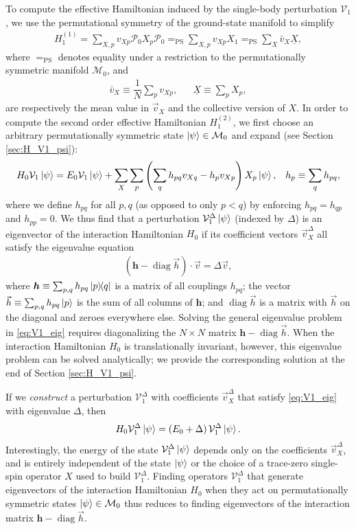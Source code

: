 \documentclass[nofootinbib,notitlepage,11pt]{revtex4-2}
\newcommand{\f}[2]{\dfrac{#1}{#2}} %
\newcommand{\p}[1]{\left(#1\right)} %
\renewcommand{\c}{\cdot} %
\newcommand{\m}{\bm} %
\renewcommand{\v}{\vec} %
\newcommand{\1}{\mathds{1}}
\newcommand{\M}{\mathcal{M}}
\renewcommand{\P}{\mathcal{P}}
\newcommand{\V}{\mathcal{V}}
\newcommand{\EQPS}{=_{\text{PS}}}
\newcommand{\col}{\underline}
\DeclareMathOperator{\diag}{diag}
\begin{document}
To compute the effective Hamiltonian induced by the single-body
perturbation $\V_1$, we use the permutational symmetry of the
ground-state manifold to simplify
\begin{align}
  H_1^{(1)} = \sum_{X,p} v_{Xp} \P_0 X_p \P_0
  \EQPS \sum_{X,p} v_{Xp} X_1
  \EQPS \sum_X \bar v_X \col{X},
  \label{eq:H_1_1}
\end{align}
where $\EQPS$ denotes equality under a restriction to the
permutationally symmetric manifold $\M_0$, and
\begin{align}
  \bar v_X \equiv \f1N \sum_p v_{Xp},
  &&
  \col{X} \equiv \sum_p X_p,
\end{align}
are respectively the mean value in $\v v_X$ and the collective version
of $X$.  In order to compute the second order effective Hamiltonian
$H_1^{(2)}$, we first choose an arbitrary permutationally symmetric
state $\ket\psi\in\M_0$ and expand (see Section \ref{sec:H_V1_psi}):
\begin{align}
  H_0 \V_1 \ket\psi
  = E_0 \V_1 \ket\psi
  + \sum_X \sum_p \p{\sum_q h_{pq} v_{Xq} - h_p v_{Xp}} X_p
  \ket\psi,
  &&
  h_p \equiv \sum_q h_{pq},
  \label{eq:H_V1_psi}
\end{align}
where we define $h_{pq}$ for all $p,q$ (as opposed to only $p<q$) by
enforcing $h_{pq}=h_{qp}$ and $h_{pp}=0$.  We thus find that a
perturbation $\V_1^\Delta\ket\psi$ (indexed by $\Delta$) is an
eigenvector of the interaction Hamiltonian $H_0$ if its coefficient
vectors $\v v_X^\Delta$ all satisfy the eigenvalue equation
\begin{align}
  \p{\m h - \diag\v h}\c\v v = \Delta \v v,
  \label{eq:V1_eig}
\end{align}
where $\m h\equiv\sum_{p,q}h_{pq}\op{p}{q}$ is a matrix of all
couplings $h_{pq}$; the vector $\v h\equiv\sum_{p,q}h_{pq}\ket{p}$ is
the sum of all columns of $\m h$; and $\diag\v h$ is a matrix with
$\v h$ on the diagonal and zeroes everywhere else.  Solving the
general eigenvalue problem in \eqref{eq:V1_eig} requires diagonalizing
the $N\times N$ matrix $\m h-\diag\v h$.  When the interaction
Hamiltonian $H_0$ is translationally invariant, however, this
eigenvalue problem can be solved analytically; we provide the
corresponding solution at the end of Section \ref{sec:H_V1_psi}.

If we {\it construct} a perturbation $\V_1^\Delta$ with coefficients
$\v v_X^\Delta$ that satisfy \eqref{eq:V1_eig} with eigenvalue
$\Delta$, then
\begin{align}
  H_0 \V_1^\Delta \ket\psi = \p{E_0 + \Delta} \V_1^\Delta \ket\psi.
\end{align}
Interestingly, the energy of the state $\V_1^\Delta\ket\psi$ depends
only on the coefficients $\v v_X^\Delta$, and is entirely independent
of the state $\ket\psi$ or the choice of a trace-zero single-spin
operator $X$ used to build $\V_1^\Delta$.  Finding operators
$\V_1^\Delta$ that generate eigenvectors of the interaction
Hamiltonian $H_0$ when they act on permutationally symmetric states
$\ket\psi\in\M_0$ thus reduces to finding eigenvectors of the
interaction matrix $\m h-\diag\v h$.
\end{document}
